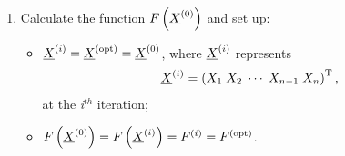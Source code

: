 \begin{enumerate}[{\bf Step 1: }]
   \item Calculate the function $F\left(\mfr[\underline{X}]{}{0}\right)$ and set up:
       \begin{itemize}
           \item $\mfr[\underline{X}]{}{i} = \mfr[\underline{X}]{}{\text{opt}} = \mfr[\underline{X}]{}{0}$, where $\mfr[\underline{X}]{}{i}$ represents
                 \begin{displaymath}
                    \mfr[\underline{X}]{}{i} = \left(X_{1}\; X_{2}\; \cdots \; X_{n-1}\;  X_{n}\right)^{\text{T}},
                 \end{displaymath}
            at the {\it i}$^{th}$ iteration;
           \item $F\left(\mfr[\underline{X}]{}{0}\right) = F\left(\mfr[\underline{X}]{}{i}\right) = \mfr[F]{}{i} = \mfr[F]{}{\text{opt}}$. 
       \end{itemize}


\end{enumerate}
